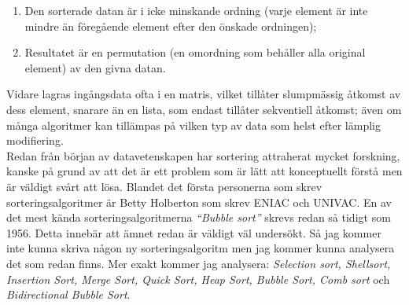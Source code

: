 \documentclass[a4]{article}
\begin{document}
\begin{enumerate}
    \item Den sorterade datan är i icke minskande ordning (varje element är inte mindre än föregående element efter den önskade ordningen);
    \item Resultatet är en permutation (en omordning som behåller alla original element) av den givna datan.
\end{enumerate}
Vidare lagras ingångsdata ofta i en matris, vilket tillåter slumpmässig åtkomst av dess element, snarare än en lista, som endast tillåter sekventiell åtkomst; även om många algoritmer kan tillämpas på vilken typ av data som helst efter lämplig modifiering.\\
Redan från början av datavetenskapen har sortering attraherat mycket forskning, kanske på grund av att det är ett problem som är lätt att konceptuellt förstå men är väldigt svårt att lösa. Blandet det första personerna som skrev sorteringsalgoritmer är Betty Holberton som skrev ENIAC och UNIVAC. En av det mest kända sorteringsalgoritmerna \textit{“Bubble sort”} skrevs redan så tidigt som 1956. Detta innebär att ämnet redan är väldigt väl undersökt. Så jag kommer inte kunna skriva någon ny sorteringsalgoritm men jag kommer kunna analysera det som redan finns. \cite{1} Mer exakt kommer jag analysera: \textit{Selection sort, Shellsort, Insertion Sort, Merge Sort, Quick Sort, Heap Sort, Bubble Sort, Comb sort} och \textit{Bidirectional Bubble Sort}.
\end{document}
